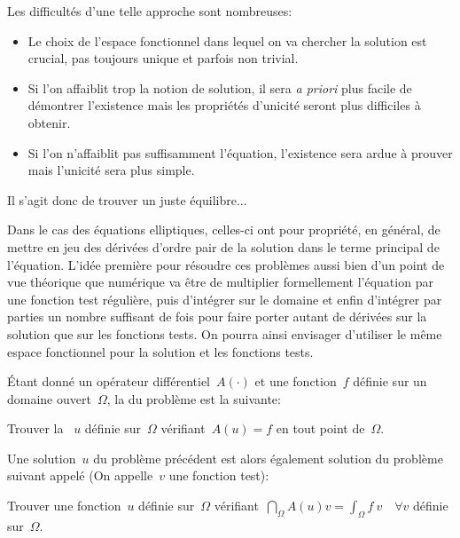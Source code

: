 \medskip
Les difficultés d'une telle approche sont nombreuses:
\begin{itemize}
  \item Le choix de l'espace fonctionnel dans lequel on va chercher la solution est crucial, pas toujours unique et parfois non trivial.
  \item Si l'on affaiblit trop la notion de solution, il sera \emph{a priori} plus facile de démontrer l'existence mais les propriétés d'unicité seront plus difficiles à obtenir.
  \item Si l'on n'affaiblit pas suffisamment l'équation, l'existence sera ardue à prouver mais l'unicité sera plus simple.
\end{itemize}


\medskip
Il s'agit donc de trouver un juste équilibre...

Dans le cas des équations elliptiques, celles-ci ont pour propriété, en général, de mettre en jeu des dérivées d'ordre pair de la solution dans le terme principal de l'équation. L'idée première pour résoudre ces problèmes aussi bien d'un point de vue théorique que numérique va être de multiplier formellement l'équation par une fonction test régulière, puis d'intégrer sur le domaine et enfin d'intégrer par parties un nombre suffisant de fois pour faire porter autant de dérivées sur la solution que sur les fonctions tests. On pourra ainsi envisager d'utiliser le même espace fonctionnel pour la solution et les fonctions tests.

\medskip
\begin{definition}
Étant donné un opérateur différentiel~$A(\cdot)$ et une fonction~$f$ définie sur un domaine ouvert~$\Omega$, la  du problème est la suivante:
\begin{center}
  Trouver la ~$u$ définie sur~$\Omega$ vérifiant~$A(u)=f$ en tout point de~$\Omega$.
\end{center}

\medskip
Une solution~$u$ du problème précédent est alors également solution du problème suivant
appelé  (On appelle~$v$ une fonction test):
\begin{center}
  Trouver une fonction~$u$ définie sur~$\Omega$ vérifiant~$\dint_\Omega A(u)v = \int_\Omega f\ v \quad \forall v$ définie sur~$\Omega$.
\end{center}
\end{definition}

